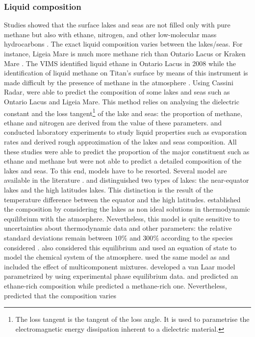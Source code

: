 \subsubsection{Liquid composition}
Studies showed that the surface lakes and seas are not filled only with pure methane but also with ethane, nitrogen, and other low-molecular mass hydrocarbons \citep{ mastrogiuseppe2014bathymetry,luspay2015experimental,mitchell2015laboratory,tan2013titan,tan2015titan}. The exact liquid composition varies between the lakes/seas. For instance, Ligeia Mare is much more methane rich than Ontario Lacus or Kraken Mare \citep{hayes2016bathymetry,le2016composition}. The VIMS identified liquid ethane in Ontario Lacus in 2008 while the identification of liquid methane on Titan's surface by means of this instrument is made difficult by the presence of methane in the atmosphere \citep{brown2008identification}. Using Cassini Radar, \citep{mastrogiuseppe2014bathymetry,hayes2016bathymetry,le2016composition} were able to predict the composition of some lakes and seas such as Ontario Lacus and Ligeia Mare. This method relies on analysing the dielectric constant and the loss tangent\footnote{The loss tangent is the tangent of the loss angle. It is used to parametrise the electromagnetic energy dissipation inherent to a dielectric material.} of the lake and seas: the proportion of methane, ethane and nitrogen are derived from the value of these parameters. \citet{luspay2015experimental} and \citet{mitchell2015laboratory} conducted laboratory experiments to study liquid properties such as evaporation rates and derived rough approximation of the lakes and seas composition. All these studies were able to predict the proportion of the major constituent such as ethane and methane but were not able to predict a detailed composition of the lakes and seas. To this end, models have to be resorted. Several model are available in the literature \citep[see, e.g.,][]{cordier2009estimate,tan2013titan,tan2015titan,glein2013geochemical}. \citet{cordier2009estimate} and \citet{tan2013titan, tan2015titan} distinguished two types of lakes: the near-equator lakes and the high latitudes lakes. This distinction is the result of the temperature difference between the equator and the high latitudes. \citet{cordier2009estimate} established the composition by considering the lakes as non ideal solutions in thermodynamic equilibrium with the atmosphere. Nevertheless, this model is quite sensitive to uncertainties about thermodynamic data and other parameters: the relative standard deviations remain between $10\%$ and $300\%$ according to the species considered \citep{cordier2012titan}. \citet{tan2013titan} also considered this equilibrium and used an equation of state to model the chemical system of the atmosphere. \citet{tan2015titan} used the same model as \citet{tan2013titan} and included the effect of multicomponent mixtures. \citet{glein2013geochemical} developed a van Laar model parametrized by using experimental phase equilibrium data. \citet{cordier2009estimate} and \citet{luspay2015experimental} predicted an ethane-rich composition while \citet{tan2013titan, tan2015titan} predicted a methane-rich one. Nevertheless, \citet{tan2015titan} predicted that the composition varies 